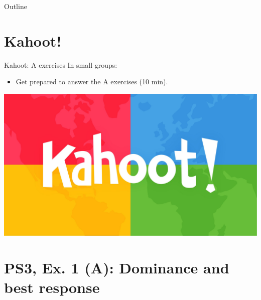 

\maketitle

\begin{frame}{Outline}
\tableofcontents
\end{frame}


\section{Kahoot!}

\begin{frame}{Kahoot: A exercises}
  In small groups:
  \begin{itemize}
    \item Get prepared to answer the A exercises (10 min).
  \end{itemize}
  \includegraphics[width=\textwidth]{figures/Kahoot}
\end{frame}


\section{PS3, Ex. 1 (A): Dominance and best response}

